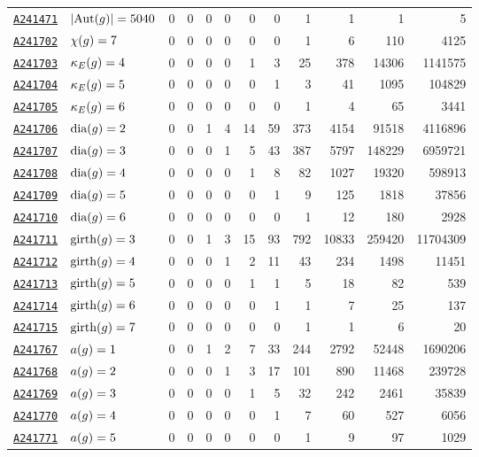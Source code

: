 \documentclass[12pt]{article}
\newcommand{\OEIS}[1]
{\href{https://oeis.org/#1}{\texttt{#1}}}
\begin{document}
\begin{appendices}
\begin{longtable}{ l l r r r r r r r r r r}
\OEIS{A241471} & $| \text{Aut}(g) | =5040$ & 0 & 0 & 0 & 0 & 0 & 0 & 1 & 1 & 1 & 5 \\
\OEIS{A241702} & $\chi(g) =7$ & 0 & 0 & 0 & 0 & 0 & 0 & 1 & 6 & 110 & 4125 \\
\OEIS{A241703} & $\kappa_{E}(g) =4$ & 0 & 0 & 0 & 0 & 1 & 3 & 25 & 378 & 14306 & 1141575 \\
\OEIS{A241704} & $\kappa_{E}(g) =5$ & 0 & 0 & 0 & 0 & 0 & 1 & 3 & 41 & 1095 & 104829 \\
\OEIS{A241705} & $\kappa_{E}(g) =6$ & 0 & 0 & 0 & 0 & 0 & 0 & 1 & 4 & 65 & 3441 \\
\OEIS{A241706} & $\text{dia}(g) =2$ & 0 & 0 & 1 & 4 & 14 & 59 & 373 & 4154 & 91518 & 4116896 \\
\OEIS{A241707} & $\text{dia}(g) =3$ & 0 & 0 & 0 & 1 & 5 & 43 & 387 & 5797 & 148229 & 6959721 \\
\OEIS{A241708} & $\text{dia}(g) =4$ & 0 & 0 & 0 & 0 & 1 & 8 & 82 & 1027 & 19320 & 598913 \\
\OEIS{A241709} & $\text{dia}(g) =5$ & 0 & 0 & 0 & 0 & 0 & 1 & 9 & 125 & 1818 & 37856 \\
\OEIS{A241710} & $\text{dia}(g) =6$ & 0 & 0 & 0 & 0 & 0 & 0 & 1 & 12 & 180 & 2928 \\
\OEIS{A241711} & $\text{girth}(g) =3$ & 0 & 0 & 1 & 3 & 15 & 93 & 792 & 10833 & 259420 & 11704309 \\
\OEIS{A241712} & $\text{girth}(g) =4$ & 0 & 0 & 0 & 1 & 2 & 11 & 43 & 234 & 1498 & 11451 \\
\OEIS{A241713} & $\text{girth}(g) =5$ & 0 & 0 & 0 & 0 & 1 & 1 & 5 & 18 & 82 & 539 \\
\OEIS{A241714} & $\text{girth}(g) =6$ & 0 & 0 & 0 & 0 & 0 & 1 & 1 & 7 & 25 & 137 \\
\OEIS{A241715} & $\text{girth}(g) =7$ & 0 & 0 & 0 & 0 & 0 & 0 & 1 & 1 & 6 & 20 \\
\OEIS{A241767} & $a(g) =1$ & 0 & 0 & 1 & 2 & 7 & 33 & 244 & 2792 & 52448 & 1690206 \\
\OEIS{A241768} & $a(g) =2$ & 0 & 0 & 0 & 1 & 3 & 17 & 101 & 890 & 11468 & 239728 \\
\OEIS{A241769} & $a(g) =3$ & 0 & 0 & 0 & 0 & 1 & 5 & 32 & 242 & 2461 & 35839 \\
\OEIS{A241770} & $a(g) =4$ & 0 & 0 & 0 & 0 & 0 & 1 & 7 & 60 & 527 & 6056 \\
\OEIS{A241771} & $a(g) =5$ & 0 & 0 & 0 & 0 & 0 & 0 & 1 & 9 & 97 & 1029 \\


\end{longtable}
\end{appendices}
\end{document}
